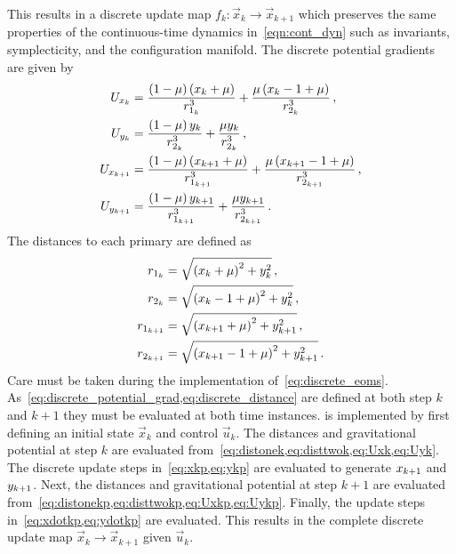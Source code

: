 \documentclass[preprint]{elsarticle}
\begin{document}
This results in a discrete update map \( f_k: \vec{x}_k \to \vec{x}_{k+1} \) which preserves the same properties of the continuous-time dynamics in~\cref{eqn:cont_dyn} such as invariants, symplecticity, and the configuration manifold.
The discrete potential gradients are given by
\begin{subequations}\label{eq:discrete_potential_grad}
\begin{align}
	U_{x_k} &= \frac{\left( 1 -\mu \right) \left( x_k + \mu \right)}{r_{1_k}^3} + \frac{ \mu \left( x_k -1 + \mu \right)}{r_{2_{k}}^3} \label{eq:Uxk} \, ,\\
	U_{y_{k}} &= \frac{\left( 1 -\mu \right) y_{k}}{r_{2_{k}}^3} + \frac{ \mu y_{k}}{r_{2_{k}}^3} \label{eq:Uyk} \, ,\\
	U_{x_{k+1}} &= \frac{\left( 1 -\mu \right) \left( x_{k+1} + \mu \right)}{r_{1_{k+1}}^3} + \frac{ \mu \left( x_{k+1} -1 + \mu \right)}{r_{2_{k+1}}^3} \label{eq:Uxkp}\, ,\\
	U_{y_{k+1}} &= \frac{\left( 1 -\mu \right) y_{k+1}}{r_{1_{k+1}}^3} + \frac{ \mu y_{k+1}}{r_{2_{k+1}}^3} \label{eq:Uykp} \, .
\end{align}	
\end{subequations}
The distances to each primary are defined as
\begin{subequations}\label{eq:discrete_distance}
\begin{align}
	r_{1_k} &= \sqrt{\left( x_k + \mu\right)^2 + y_{k}^2} \label{eq:distonek}\, ,\\
	r_{2_{k}} &= \sqrt{\left( x_k - 1 + \mu\right)^2 + y_{k}^2} \label{eq:disttwok}\, ,\\
	r_{1_{k+1}} &= \sqrt{\left( x_{k+1} + \mu\right)^2 + y_{k+1}^2} \label{eq:distonekp}\, ,\\
	r_{2_{k+1}} &= \sqrt{\left( x_{k+1} - 1 + \mu\right)^2 + y_{k+1}^2} \label{eq:disttwokp} \, .
\end{align}
\end{subequations}
Care must be taken during the implementation of~\cref{eq:discrete_eoms}.
As~\cref{eq:discrete_potential_grad,eq:discrete_distance} are defined at both step \( k \) and \( k+1 \) they must be evaluated at both time instances.
 is implemented by first defining an initial state \( \vec{x}_k \) and control \( \vec{u}_k \).
The distances and gravitational potential at step \( k \) are evaluated from~\cref{eq:distonek,eq:disttwok,eq:Uxk,eq:Uyk}.
The discrete update steps in~\cref{eq:xkp,eq:ykp} are evaluated to generate \( x_{k+1} \) and \( y_{k+1}\).
Next, the distances and gravitational potential at step \( k+1 \) are evaluated from~\cref{eq:distonekp,eq:disttwokp,eq:Uxkp,eq:Uykp}. 
Finally, the update steps in~\cref{eq:xdotkp,eq:ydotkp} are evaluated.
This results in the complete discrete update map \( \vec{x}_k \to \vec{x}_{k+1} \) given \( \vec{u}_k \).
\end{document}
